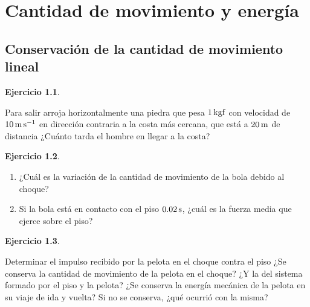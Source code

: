 \documentclass[a4paper,12pt,twoside]{book}
\newtheorem{ejercicio}{{Ejercicio}}[chapter]
\begin{document}
\chapter{Cantidad de movimiento y energía}


\section{Conservación de la cantidad de movimiento lineal}

\begin{mdframed}[style=ejercicio-facil]
    \begin{ejercicio}
    \end{ejercicio}
    Para salir arroja horizontalmente una piedra que pesa $1 \, \mathrm{kgf}$ con velocidad de $10 \, \si{\metre\per\second}$ en dirección contraria a la costa más cercana, que está a $20 \, \si{\metre}$ de distancia 
    ¿Cuánto tarda el hombre en llegar a la costa?
\end{mdframed}

\begin{mdframed}[style=ejercicio-facil]
    \begin{ejercicio}
    \end{ejercicio}
    \begin{enumerate}
        \item ¿Cuál es la variación de la cantidad de movimiento de la bola debido al choque?
        \item Si la bola está en contacto con el piso $0.02 \, \si{\second}$, ¿cuál es la fuerza media que ejerce sobre el piso?
    \end{enumerate}
\end{mdframed}

\begin{mdframed}[style=ejercicio-facil]
    \begin{ejercicio}
    \end{ejercicio}
    Determinar el impulso recibido por la pelota en el choque contra el piso ¿Se conserva la cantidad de movimiento de la pelota en el choque? ¿Y la del sistema formado por el piso y la pelota?
    ¿Se conserva la energía mecánica de la pelota en su viaje de ida y vuelta? Si no se conserva, ¿qué ocurrió con la misma?
\end{mdframed}
\end{document}
